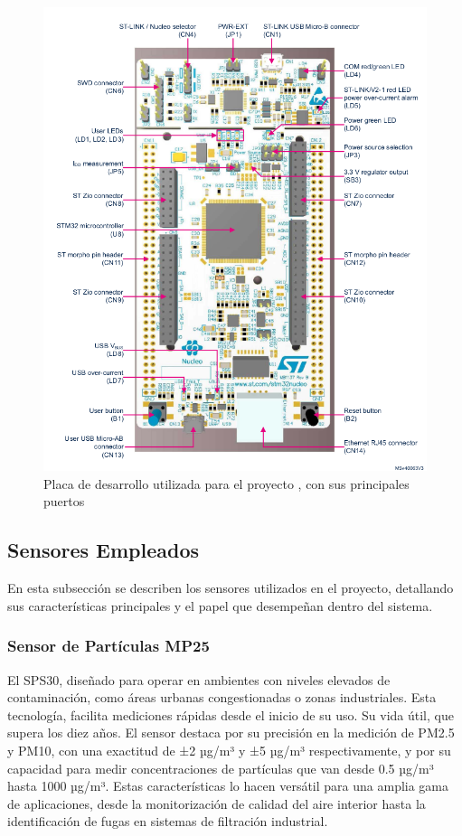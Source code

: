 \begin{figure}
	\centering
	\includegraphics[width=0.7\linewidth]{Cap_02/fig/placanucleoF429ZI}
	\caption{Placa de desarrollo utilizada para el proyecto , con sus principales puertos}
	\label{fig:placanucleof429zi}
\end{figure}




\subsection{Sensores Empleados}
En esta subsección se describen los sensores utilizados en el proyecto, detallando sus características principales y el papel que desempeñan dentro del sistema.

\subsubsection{Sensor de Partículas MP25}


El SPS30, diseñado para operar  en ambientes con niveles elevados de contaminación, como áreas urbanas congestionadas o zonas industriales. Esta tecnología, facilita mediciones rápidas desde el inicio de su uso. Su vida útil, que supera los diez años. El sensor destaca por su precisión en la medición de PM2.5 y PM10, con una exactitud de ±2 µg/m³ y ±5 µg/m³ respectivamente, y por su capacidad para medir concentraciones de partículas que van desde 0.5 µg/m³ hasta 1000 µg/m³. Estas características lo hacen versátil para una amplia gama de aplicaciones, desde la monitorización de calidad del aire interior hasta la identificación de fugas en sistemas de filtración industrial.

